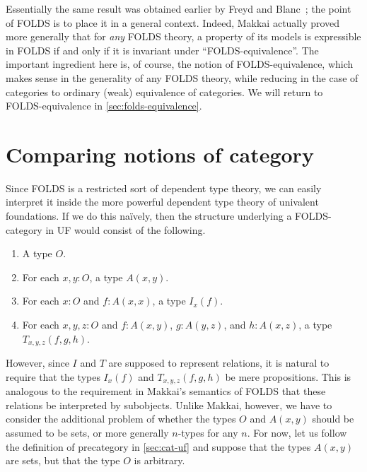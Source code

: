 \documentclass{amsart}
\begin{document}
Essentially the same result was obtained earlier by Freyd and Blanc~\cite{freyd:invar-eqv,blanc:eqv-log}; the point of FOLDS is to place it in a general context.
Indeed, Makkai actually proved more generally that for \emph{any} FOLDS theory, a property of its models is expressible in FOLDS if and only if it is invariant under ``FOLDS-equivalence''.
The important ingredient here is, of course, the notion of FOLDS-equivalence, which makes sense in the generality of any FOLDS theory, while reducing in the case of categories to ordinary (weak) equivalence of categories.
We will return to FOLDS-equivalence in \autoref{sec:folds-equivalence}.



\section{Comparing notions of category}
\label{sec:categories}

Since FOLDS is a restricted sort of dependent type theory, we can easily interpret it inside the more powerful dependent type theory of univalent foundations.
If we do this na\"ively, then the structure underlying a FOLDS-category in UF would consist of the following.
\begin{enumerate}
\item A type $O$.\label{item:foldscat1}
\item For each $x,y:O$, a type $A(x,y)$.\label{item:foldscat2}
\item For each $x:O$ and $f:A(x,x)$, a type $I_x(f)$.\label{item:foldscat3}
\item For each $x,y,z:O$ and $f:A(x,y)$, $g:A(y,z)$, and $h:A(x,z)$, a type $T_{x,y,z}(f,g,h)$.\label{item:foldscat4}
\end{enumerate}
However, since $I$ and $T$ are supposed to represent relations, it is natural to require that the types $I_x(f)$ and $T_{x,y,z}(f,g,h)$ be mere propositions.
This is analogous to the requirement in Makkai's semantics of FOLDS that these relations be interpreted by subobjects.
Unlike Makkai, however, we have to consider the additional problem of whether the types $O$ and $A(x,y)$ should be assumed to be sets, or more generally $n$-types for any $n$.
For now, let us follow the definition of precategory in \autoref{sec:cat-uf} and suppose that the types $A(x,y)$ are sets, but that the type $O$ is arbitrary.
\end{document}

